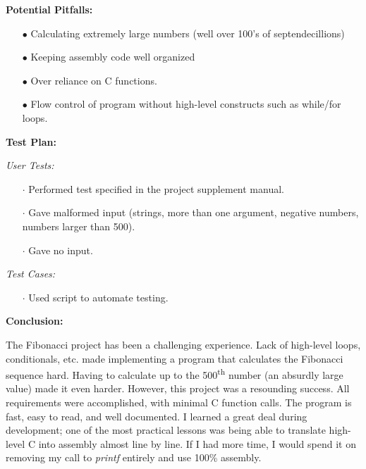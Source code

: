 \documentclass{article}
\begin{document}
\begin{flushleft}
\textbf{Potential Pitfalls:}
\vspace{.5pc}
\end{flushleft}

\begin{itemize}
	\item[$\bullet$] Calculating extremely large numbers (well over 100's of 
	septendecillions)
	\item[$\bullet$] Keeping assembly code well organized
	\item[$\bullet$] Over reliance on C functions.
	\item[$\bullet$] Flow control of program without high-level constructs 
	such as while/for loops.
\end{itemize}
\vspace{.5pc}

\begin{flushleft}
\textbf{Test Plan:}
\vspace{.5pc}
\end{flushleft}

\textit{User Tests:}
\begin{itemize}
	\item[$\cdot$] Performed test specified in the project supplement manual.
	\item[$\cdot$] Gave malformed input (strings, more than one argument, 
	negative numbers, numbers larger than 500).
	\item[$\cdot$] Gave no input.
\end{itemize}

\textit{Test Cases:}
\begin{itemize}
	\item[$\cdot$] Used script to automate testing.
	\end{itemize}
\vspace{.5pc}

\begin{flushleft}
\textbf{Conclusion:}
\vspace{.5pc}
\end{flushleft}
The Fibonacci project has been a challenging experience.  Lack of high-level
loops, conditionals, etc. made implementing a program that calculates the 
Fibonacci sequence hard. Having to calculate up to the 500\textsuperscript{th}
number (an absurdly large value) made it even harder.  However, this project 
was a resounding success.  All requirements were accomplished, with minimal
C function calls.  The program is fast, easy to read, and well documented.  I
learned a great deal during development; one of the most practical lessons was
being able to translate high-level C into assembly almost line by line.  If I 
had more time, I would spend it on removing my call to \textit{printf} 
entirely and use 100\% assembly.
\end{document}
